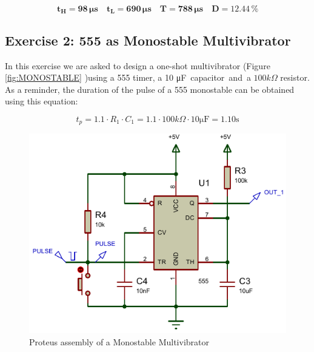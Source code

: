 \documentclass[a4paper, 11pt, oneside]{article}
\begin{document}
\vspace{-.4cm}

\begin{equation*}
    \mathbf{t_H} = \mathbf{98 \, \si\micro \text{s}} \quad
    \mathbf{t_L} = \mathbf{690 \, \si\micro \text{s}} \quad
    \mathbf{T} = \mathbf{788 \, \si\micro \text{s}} \quad
    \mathbf{D} =  \mathbf{12.44 \, \text{\%}} 
\end{equation*}


\subsection{Exercise 2: 555 as Monostable Multivibrator}

In this exercise we are asked to design a one-shot multivibrator (Figure \ref{fig:MONOSTABLE} )using a 555 timer, a 10 \si\micro F capacitor and a $100k\Omega$ resistor. As a reminder, the duration of the pulse of a 555 monostable can be obtained using this equation:

\begin{equation*}
    t_{p} = 1.1 \cdot R_1 \cdot C_1 = 1.1 \cdot 100k\Omega \cdot 10 \si\micro \text{F} = 1.10 \text{s}
\end{equation*}


\begin{figure}[H]
    \centering
    \includegraphics[scale = 1.045]{Graphics/Practice 2/GRAPHICS/555/GRAPHS/PROTEUS/ASSEMBLY/555_MONO_ASSEMBLY.PDF}
    \caption{Proteus assembly of a Monostable Multivibrator}
    \label{fig:555_MONO_ASSEMBLY}
\end{figure}
\end{document}
